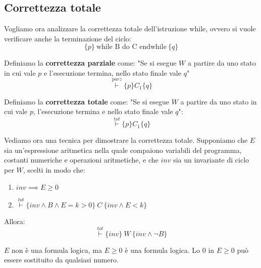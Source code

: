 \subsection{Correttezza totale}
Vogliamo ora analizzare la correttezza totale dell'istruzione while, ovvero si
vuole verificare anche la terminazione del ciclo:
\begin{equation}
    \{p\} \ \text{while B do C endwhile} \ \{q\}
\end{equation}
\begin{definizione}
    Definiamo la \textbf{correttezza parziale} come: "Se si esegue $W$ a partire
    da uno stato in cui vale $p$ e l'esecuzione termina, nello stato finale vale
    $q$"
    \begin{equation}
        \stackrel{parz}{\vdash} \{p\} C_1 \{q\}
    \end{equation}
\end{definizione}
\begin{definizione}
    Definiamo la \textbf{correttezza totale} come: "Se si esegue $W$ a partire
    da uno stato in cui vale $p$, l'esecuzione termina e nello stato finale vale
    $q$":
    \begin{equation}
        \stackrel{tot}{\vdash} \{p\} C_1 \{q\}
    \end{equation}
\end{definizione}
Vediamo ora una tecnica per dimostrare la correttezza totale. Supponiamo che $E$
sia un'espressione aritmetica nella quale compaiono variabili del programma,
costanti numeriche e operazioni aritmetiche, e che $inv$ sia un invariante di
ciclo per $W$, scelti in modo che:
\begin{enumerate}
    \item $inv \implies E \geq 0$
    \item $\stackrel{tot}{\vdash} \{inv \land B \land E = k > 0\} \ C \
              \{inv \land E < k\}$
\end{enumerate}
Allora:
\begin{equation}
    \stackrel{tot}{\vdash} \{inv\} \ W \ \{inv \land \lnot B\}
\end{equation}
\begin{nota}
    $E$ non è una formula logica, ma $E \geq 0$ è una formula logica. Lo $0$ in
    $E \geq 0$ può essere sostituito da qualsiasi numero.
\end{nota}
